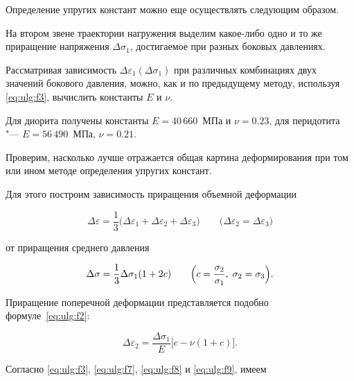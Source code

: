 Определение упругих констант можно  еще осуществлять следующим образом. 

На втором звене траектории нагружения выделим какое-либо одно и то же приращение напряжения $\Delta\sigma_1$, достигаемое при разных боковых давлениях. 

Рассматривая зависимость $\Delta\varepsilon_1(\Delta\sigma_1)$ при различных комбинациях двух значений бокового давления, можно, как и по предыдущему методу, используя \eqref{eq:ulg:f3}, вычислить константы $E$ и $\nu$.  

Для диорита получены константы  $E=40\,660$~МПа и $\nu=0.23$, для перидотита "--- $E=56\,490$~МПа, $\nu=0.21$. 

Проверим, насколько лучше отражается общая картина деформирования при том или ином методе определения упругих констант. 

Для этого построим зависимость приращения объемной деформации %

\begin{equation}  

\label{eq:ulg:f7} 

\Delta\varepsilon=\frac{1}{3}\big(\Delta\varepsilon_1+\Delta\varepsilon_2+\Delta\varepsilon_3\big)    \qquad  \big(\Delta\varepsilon_2=\Delta\varepsilon_3 \big) 

\end{equation}  

от приращения среднего давления %

\begin{equation}   

\label{eq:ulg:f8} 

\Delta\sigma=\frac{1}{3}\Delta\sigma_1(1+2c)  \qquad    \Bigl(c=\frac{\sigma_2}{\sigma_1}, \; \sigma_2=\sigma_3\Bigr). 

\end{equation} 

Приращение поперечной деформации представляется подобно формуле~\eqref{eq:ulg:f2}:

\begin{equation} \label{eq:ulg:f9}

\Delta\varepsilon_2=\frac{\Delta\sigma_1}{E}\bigl[c-\nu(1+c)\bigr]. 

\end{equation} 



Согласно \eqref{eq:ulg:f3}, \eqref{eq:ulg:f7}, \eqref{eq:ulg:f8} и \eqref{eq:ulg:f9}, имеем

